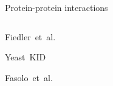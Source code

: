 \begin{frame}{Protein-protein interactions}
\begin{columns}
\begin{column}{0.35\textwidth}

Fiedler~et~al.~\cite{Fiedler2009PK}
\label{sec:fiedler_data}








Yeast~KID~\cite{yeastkid}
\label{sec:yeastkid}



Fasolo~et~al.~\cite{Fasolo2011}
\label{sec:fasolo}


\end{column}
\end{columns}
\end{frame}
